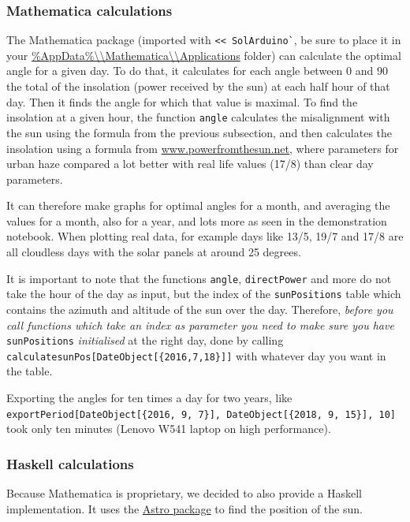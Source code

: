 \documentclass{article}
\begin{document}
    \subsubsection{Mathematica calculations}\label{subsec:mathematicaCalculations}

    The Mathematica package (imported with \verb|<< SolArduino`|, be sure to place it in your
    \url{\%AppData\%\\Mathematica\\Applications} folder) can calculate the optimal angle for a given day.
    To do that, it calculates for each angle between $0$ and $90$ the total of the insolation (power received by the sun) at each half hour of that day.
    Then it finds the angle for which that value is maximal.
    To find the insolation at a given hour, the function \verb|angle| calculates the misalignment with the sun using the formula from the previous subsection, and then calculates the insolation using a formula from \href{http://www.powerfromthesun.net/Book/chapter02/chapter02.html#ZEqnNum929295 }{www.powerfromthesun.net}, where parameters for urban haze compared a lot better with real life values (17/8) than clear day parameters.

    It can therefore make graphs for optimal angles for a month, and averaging the values for a month, also for a year, and lots more as seen in the demonstration notebook.
    When plotting real data, for example days like 13/5, 19/7 and 17/8 are all cloudless days with the solar panels at around 25 degrees.

    It is important to note that the functions \verb|angle|, \verb|directPower| and more do not take the hour of the day as input, but the index of the \verb|sunPositions| table which contains the azimuth and altitude of the sun over the day.
    Therefore, \textit{before you call functions which take an index as parameter you need to make sure you have }\verb|sunPositions| \textit{initialised} at the right day, done by calling \verb|calculatesunPos[DateObject[{2016,7,18}]]| with whatever day you want in the table.

    Exporting the angles for ten times a day for two years, like  \verb|exportPeriod[DateObject[{2016, 9, 7}], DateObject[{2018, 9, 15}], 10]| took only ten minutes (Lenovo W541 laptop on high performance).

    \subsubsection{Haskell calculations}

    Because Mathematica is proprietary, we decided to also provide a Haskell implementation.
    It uses the \href{https://hackage.haskell.org/package/astro}{Astro package} to find the position of the sun.
\end{document}
